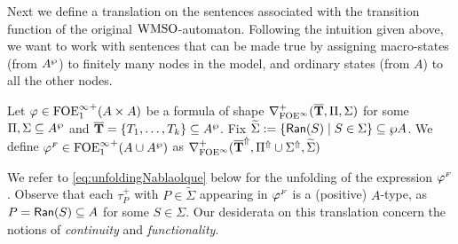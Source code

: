 Next we define a translation on the sentences associated with the
transition function of the original $\mathrm{WMSO}$-automaton. Following the intuition given above, we want to work with sentences that can be made true by assigning macro-states (from $A^{\wp}$) to finitely many nodes in the model, and ordinary states (from $A$) to all the other nodes. 

\begin{definition}\label{DEF_finitary_lifting}
Let $\varphi \in {\ensuremath{\mathrm{FOE}^{\infty}_1}}^+(A \times A)$ be a formula of shape $\nabla^+_{\mathrm{FOE}^{\infty}}(\overline{{\mathbf{T}}},\Pi,\Sigma)$ for some $\Pi,\Sigma \subseteq A^{\wp}$ and $\overline{{\mathbf{T}}} = \{T_1,\dots,T_k\} \subseteq A^{\wp}$. Fix $\widetilde{\Sigma} \mathrel{: =} \{\mathsf{Ran}(S) \mid S \in \Sigma\} \subseteq \wp A$. We define $\varphi^{{\scriptscriptstyle F}} \in {\ensuremath{\mathrm{FOE}^{\infty}_1}}^+(A \cup A^{\wp})$ as $\nabla^+_{\mathrm{FOE}^{\infty}}(\overline{{\mathbf{T}}}^{\Uparrow},\Pi^{\Uparrow} \cup \Sigma^{\Uparrow},\widetilde{\Sigma})$\end{definition}

We refer to \eqref{eq:unfoldingNablaolque} below for the unfolding of the expression $\varphi^{{\scriptscriptstyle F}}$. Observe that each ${\tau}^{+}_{P}$ with $P \in \widetilde{\Sigma}$ appearing in $\varphi^{{\scriptscriptstyle F}}$ is a (positive) $A$-type, as $P = \mathsf{Ran}(S) \subseteq A$ for some $S \in \Sigma$. Our desiderata on this translation concern the notions of \emph{continuity} and \emph{functionality}.

